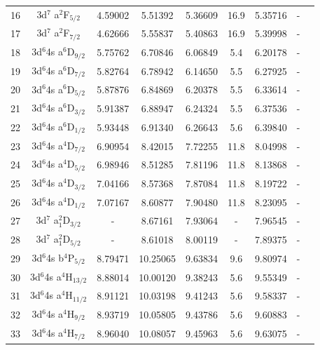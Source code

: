 \begin{table}[h]
\begin{center}
\begin{tabular}{@{} l *8c @{}}
\multicolumn{1}{c}{ 16} & 3d$^7$ a$^2$F$_{ 5/2}$ &  4.59002  &  5.51392 &    5.36609 &  16.9 & 5.35716   & - \\
\multicolumn{1}{c}{ 17} & 3d$^7$ a$^2$F$_{ 7/2}$ &  4.62666  &  5.55837 &    5.40863 &   16.9 & 5.39998  & - \\
\multicolumn{1}{c}{ 18} & 3d$^6$4s a$^6$D$_{ 9/2}$ &  5.75762  & 6.70846 &     6.06849 & 5.4 & 6.20178   & - \\
\multicolumn{1}{c}{ 19} & 3d$^6$4s a$^6$D$_{ 7/2}$ &  5.82764  &  6.78942 &     6.14650 &  5.5 & 6.27925 & -  \\
\multicolumn{1}{c}{ 20} & 3d$^6$4s a$^6$D$_{ 5/2}$ &  5.87876  &  6.84869 &    6.20378 & 5.5 & 6.33614   & - \\
\multicolumn{1}{c}{ 21} & 3d$^6$4s a$^6$D$_{ 3/2}$ &  5.91387  & 6.88947 &    6.24324 &  5.5 & 6.37536 & - \\ 
\multicolumn{1}{c}{ 22} & 3d$^6$4s a$^6$D$_{ 1/2}$ &  5.93448  & 6.91340 &    6.26643 &  5.6 & 6.39840 & - \\
\multicolumn{1}{c}{ 23} & 3d$^6$4s a$^4$D$_{ 7/2}$ &  6.90954  & 8.42015 &    7.72255 &  11.8 & 8.04998   & - \\
\multicolumn{1}{c}{ 24} & 3d$^6$4s a$^4$D$_{ 5/2}$ &  6.98946  &  8.51285 &    7.81196 &   11.8 & 8.13868& - \\
\multicolumn{1}{c}{ 25} & 3d$^6$4s a$^4$D$_{ 3/2}$ &  7.04166  &  8.57368 &    7.87084 &  11.8 & 8.19722 & - \\
\multicolumn{1}{c}{ 26} & 3d$^6$4s a$^4$D$_{ 1/2}$ &  7.07167  &  8.60877 &    7.90480 &  11.8 & 8.23095 & - \\
\multicolumn{1}{c}{ 27} & 3d$^7$ a$^2_1$D$_{ 3/2}$ &  -  &  8.67161 & 7.93064 &   - & 7.96545 & - \\
\multicolumn{1}{c}{ 28} & 3d$^7$ a$^2_1$D$_{ 5/2}$ &  -  & 8.61018 &  8.00119 & - & 7.89375 & - \\
\multicolumn{1}{c}{ 29} & 3d$^6$4s b$^4$P$_{ 5/2}$ &  8.79471  &  10.25065 &   9.63834 &  9.6 & 9.80974  &   - \\
\multicolumn{1}{c}{ 30} & 3d$^6$4s a$^4$H$_{13/2}$ &  8.88014  &  10.00120 &    9.38243 &  5.6 & 9.55349  & - \\
\multicolumn{1}{c}{ 31} & 3d$^6$4s a$^4$H$_{11/2}$ &  8.91121  & 10.03198  &    9.41243 &  5.6 & 9.58337  & - \\
\multicolumn{1}{c}{ 32} & 3d$^6$4s a$^4$H$_{ 9/2}$ &  8.93719  &  10.05805 &    9.43786 &  5.6 & 9.60883   & - \\
\multicolumn{1}{c}{ 33} & 3d$^6$4s a$^4$H$_{ 7/2}$ &  8.96040  &  10.08057 &    9.45963 &  5.6 & 9.63075   & - \\

\end{tabular}
\end{center}
\end{table}
